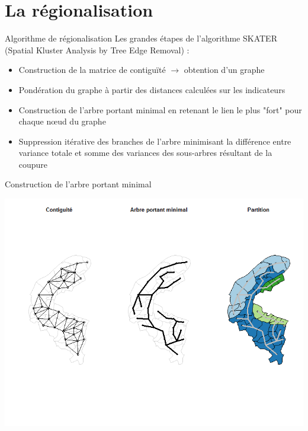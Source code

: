 \documentclass[11pt]{beamer}
\begin{document}
\section{La régionalisation}

\begin{frame}{Algorithme de régionalisation}
Les grandes étapes de l'algorithme SKATER (Spatial Kluster Analysis by Tree Edge Removal) :
\begin{itemize}
\item Construction de la matrice de contiguïté $\rightarrow$ obtention d'un graphe
\item Pondération du graphe à partir des distances calculées sur les indicateurs
\item Construction de l'arbre portant minimal en retenant le lien le plus "fort" pour chaque n\oe ud du graphe 
\item Suppression itérative des branches de l'arbre minimisant la différence entre variance totale et somme des variances des sous-arbres résultant de la coupure
\end{itemize}
\end{frame}

\begin{frame}{Construction de l'arbre portant minimal}
\begin{center}
\includegraphics[scale=.55]{img/SKATER}
\end{center}
\end{frame}
\end{document}
